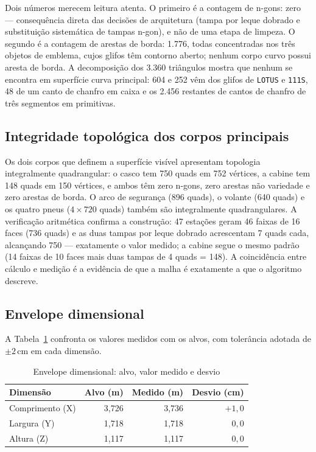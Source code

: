Dois n\'umeros merecem leitura atenta. O primeiro \'e a contagem de n-gons: zero ---
consequ\^encia direta das decis\~oes de arquitetura (tampa por leque dobrado e
substitui\c{c}\~ao sistem\'atica de tampas n-gon), e n\~ao de uma etapa de limpeza. O
segundo \'e a contagem de arestas de borda: 1.776, todas concentradas nos tr\^es objetos de
emblema, cujos glifos t\^em contorno aberto; nenhum corpo curvo possui aresta de borda. A
decomposi\c{c}\~ao dos 3.360 tri\^angulos mostra que nenhum se encontra em
superf\'icie curva principal: 604 e 252 v\^em dos glifos de \texttt{LOTUS} e
\texttt{111S}, 48 de um canto de chanfro em caixa e os 2.456 restantes de cantos de
chanfro de tr\^es segmentos em primitivas.

\subsection{Integridade topol\'ogica dos corpos principais}

Os dois corpos que definem a superf\'icie vis\'ivel apresentam topologia integralmente
quadrangular: o casco tem 750 quads em 752 v\'ertices, a cabine tem 148 quads em 150
v\'ertices, e ambos t\^em zero n-gons, zero arestas n\~ao variedade e zero arestas de
borda. O arco de seguran\c{c}a (896 quads), o volante (640 quads) e os quatro pneus
($4 \times 720$ quads) tamb\'em s\~ao integralmente quadrangulares. A
verifica\c{c}\~ao aritm\'etica confirma a constru\c{c}\~ao: 47 esta\c{c}\~oes geram 46
faixas de 16 faces (736 quads) e as duas tampas por leque dobrado acrescentam 7 quads
cada, alcan\c{c}ando 750 --- exatamente o valor medido; a cabine segue o mesmo padr\~ao
(14 faixas de 10 faces mais duas tampas de 4 quads = 148). A coincid\^encia entre
c\'alculo e medi\c{c}\~ao \'e a evid\^encia de que a malha \'e exatamente a que o
algoritmo descreve.

\subsection{Envelope dimensional}

A Tabela~\ref{tab:envelope} confronta os valores medidos com os alvos, com toler\^ancia
adotada de $\pm2$\,cm em cada dimens\~ao.

\begin{table}[htbp]
\centering
\caption{Envelope dimensional: alvo, valor medido e desvio}
\label{tab:envelope}
\footnotesize
\begin{tabular}{>{\raggedright\arraybackslash}p{3.6cm}rrr}
\toprule
\textbf{Dimens\~ao} & \textbf{Alvo (m)} & \textbf{Medido (m)} & \textbf{Desvio (cm)} \\
\midrule
Comprimento (X) & 3,726 & 3,736 & $+1,0$ \\
Largura (Y) & 1,718 & 1,718 & $0,0$ \\
Altura (Z) & 1,117 & 1,117 & $0,0$ \\
\bottomrule
\end{tabular}
\end{table}

